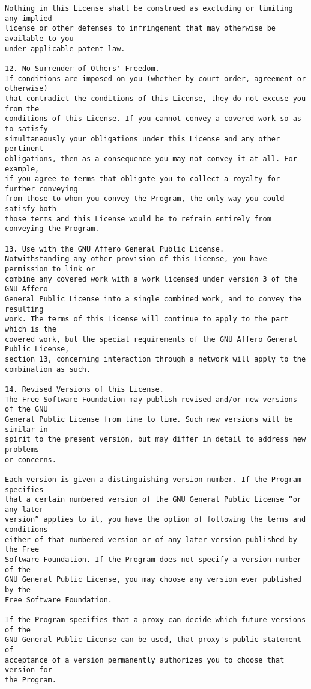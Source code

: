 \begin{verbatim}
Nothing in this License shall be construed as excluding or limiting any implied
license or other defenses to infringement that may otherwise be available to you
under applicable patent law.

12. No Surrender of Others' Freedom.
If conditions are imposed on you (whether by court order, agreement or otherwise)
that contradict the conditions of this License, they do not excuse you from the
conditions of this License. If you cannot convey a covered work so as to satisfy
simultaneously your obligations under this License and any other pertinent
obligations, then as a consequence you may not convey it at all. For example,
if you agree to terms that obligate you to collect a royalty for further conveying
from those to whom you convey the Program, the only way you could satisfy both
those terms and this License would be to refrain entirely from conveying the Program.

13. Use with the GNU Affero General Public License.
Notwithstanding any other provision of this License, you have permission to link or
combine any covered work with a work licensed under version 3 of the GNU Affero
General Public License into a single combined work, and to convey the resulting
work. The terms of this License will continue to apply to the part which is the
covered work, but the special requirements of the GNU Affero General Public License,
section 13, concerning interaction through a network will apply to the
combination as such.

14. Revised Versions of this License.
The Free Software Foundation may publish revised and/or new versions of the GNU
General Public License from time to time. Such new versions will be similar in
spirit to the present version, but may differ in detail to address new problems
or concerns.

Each version is given a distinguishing version number. If the Program specifies
that a certain numbered version of the GNU General Public License “or any later
version” applies to it, you have the option of following the terms and conditions
either of that numbered version or of any later version published by the Free
Software Foundation. If the Program does not specify a version number of the
GNU General Public License, you may choose any version ever published by the
Free Software Foundation.

If the Program specifies that a proxy can decide which future versions of the
GNU General Public License can be used, that proxy's public statement of
acceptance of a version permanently authorizes you to choose that version for
the Program.


\end{verbatim}
